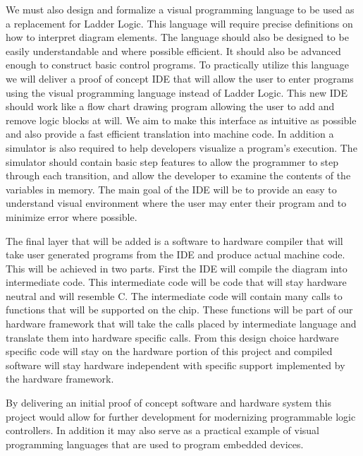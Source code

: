 We must also design and formalize a visual programming language to be used as a replacement for Ladder Logic. This language will require precise definitions on how to interpret diagram elements. The language should also be designed to be easily understandable and where possible efficient. It should also be advanced enough to construct basic control programs. To practically utilize this language we will deliver a proof of concept IDE that will allow the user to enter programs using the visual programming language instead of Ladder Logic. This new IDE should work like a flow chart drawing program allowing the user to add and remove logic blocks at will. We aim to make this interface as intuitive as possible and also provide a fast efficient translation into machine code. In addition a simulator is also required to help developers visualize a program's execution. The simulator should contain basic step features to allow the programmer to step through each transition, and allow the developer to examine the contents of the variables in memory. The main goal of the IDE will be to provide an easy to understand visual environment where the user may enter their program and to minimize error where possible.

The final layer that will be added is a software to hardware compiler that will take user generated programs from the IDE and produce actual machine code. This will be achieved in two parts. First the IDE will compile the diagram into intermediate code. This intermediate code will be code that will stay hardware neutral and will resemble C. The intermediate code will contain many calls to functions that will be supported on the chip. These functions will be part of our hardware framework that will take the calls placed by intermediate language and translate them into hardware specific calls. From this design choice hardware specific code will stay on the hardware portion of this project and compiled software will stay hardware independent with specific support implemented by the hardware framework.

By delivering an initial proof of concept software and hardware system this project would allow for further development for modernizing programmable logic controllers. In addition it may also serve as a practical example of visual programming languages that are used to program embedded devices.